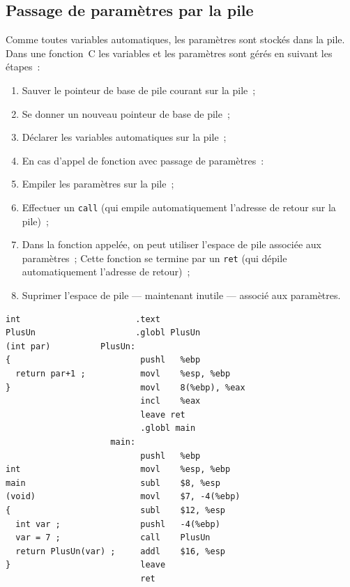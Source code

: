 \begin{frame}
  \section{Passage de param\`etres par la pile}%
        Comme toutes variables automatiques, les param\`etres sont stock\'es
        dans la pile. Dans une fonction~C les variables et 
        les param\`etres sont g\'er\'es en suivant les \'etapes~:
        \begin{enumerate}
        \item Sauver le pointeur de base de pile courant sur la pile~;
        \item Se donner un nouveau pointeur de base de pile~;
        \item D\'eclarer les variables automatiques sur la pile~;
        \item[] En cas d'appel de fonction avec passage de param\`etres~:
        \item Empiler les param\`etres sur la pile~;
        \item Effectuer un \texttt{call} (qui empile automatiquement
        l'adresse de retour sur la pile)~;
        \item[] Dans la fonction appel\'ee, on peut utiliser l'espace
        de pile associ\'ee aux param\`etres~;
         Cette fonction se termine par un \texttt{ret} (qui  
        d\'epile automatiquement l'adresse de retour)~;
        \item Suprimer l'espace de pile --- maintenant inutile --- 
        associ\'e aux param\`etres.
        \end{enumerate}
        \end{frame}
\begin{frame}[fragile]

\begin{verbatim}
int                       .text 
PlusUn                    .globl PlusUn 
(int par)          PlusUn:                                
{                          pushl   %ebp                
  return par+1 ;           movl    %esp, %ebp        
}                          movl    8(%ebp), %eax        
                           incl    %eax                
                           leave ret                        
                           .globl main                        
                     main:                                
                           pushl   %ebp                
int                        movl    %esp, %ebp        
main                       subl    $8, %esp        
(void)                     movl    $7, -4(%ebp)        
{                          subl    $12, %esp        
  int var ;                pushl   -4(%ebp)        
  var = 7 ;                call    PlusUn                
  return PlusUn(var) ;     addl    $16, %esp        
}                          leave
                           ret                     
\end{verbatim}
\end{frame}
